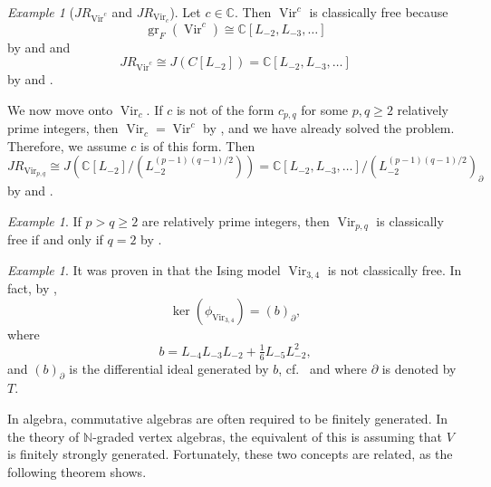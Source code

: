 \documentclass[a4paper, 12pt, reqno]{amsart}
\theoremstyle{remark}
\newtheorem{example}[theorem]{Example}
\DeclareMathOperator{\Vir}{Vir}
\DeclareMathOperator{\gr}{gr}
\begin{document}
\begin{example}[$JR_{\Vir^c}$ and $JR_{\Vir_c}$]
  \label{exa:17}
  Let $c \in \mathbb{C}$.
  Then $\Vir^c$ is classically free because
  \begin{equation*}
    \gr_F(\Vir^c) \cong \mathbb{C}[L_{-2}, L_{-3}, \dots]
  \end{equation*}
  by  and  and
  \begin{equation*}
    JR_{\Vir^c} \cong J(C[L_{-2}]) = \mathbb{C}[L_{-2}, L_{-3}, \dots]
  \end{equation*}
  by  and .

  We now move onto $\Vir_c$.
  If $c$ is not of the form $c_{p, q}$ for some $p, q \ge 2$ relatively prime integers, then $\Vir_c = \Vir^c$ by , and we have already solved the problem.
  Therefore, we assume $c$ is of this form.
  Then
  \begin{equation*}
    JR_{\Vir_{p, q}} \cong J(\mathbb{C}[L_{-2}]/(L_{-2}^{(p - 1)(q - 1)/2})) = \mathbb{C}[L_{-2}, L_{-3}, \dots]/(L_{-2}^{(p - 1)(q - 1)/2})_{\partial}
  \end{equation*}
  by  and .
\end{example}

\begin{example}
  \label{exa:18}
  If $p > q \ge 2$ are relatively prime integers, then $\Vir_{p, q}$ is classically free if and only if $q = 2$ by \cite{van_ekeren_chiral_2021}.
\end{example}

\begin{example}
  \label{exa:19}
  It was proven in \cite{andrews_singular_2022} that the Ising model $\Vir_{3, 4}$ is not classically free.
  In fact, by \cite[Theorem 2]{andrews_singular_2022},
  \begin{equation*}
    \ker(\phi_{\Vir_{3, 4}}) = (b)_{\partial},
  \end{equation*}
  where
  \begin{equation*}
    b = L_{-4}L_{-3}L_{-2} + \tfrac{1}{6}L_{-5}L_{-2}^2,
  \end{equation*}
  and $(b)_{\partial}$ is the differential ideal generated by $b$, cf.\  and  where $\partial$ is denoted by $T$.
\end{example}

In algebra, commutative algebras are often required to be finitely generated.
In the theory of $\mathbb{N}$-graded vertex algebras, the equivalent of this is assuming that $V$ is finitely strongly generated.
Fortunately, these two concepts are related, as the following theorem shows.
\end{document}

